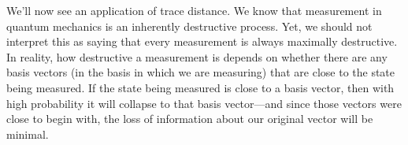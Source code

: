 \documentclass[11pt]{report}
\theoremstyle{plain}
\theoremstyle{definition}
\newtheorem{definition}[theorem]{Definition}
\newcommand{\Tr}{\operatorname{Tr}}
\begin{document}
We'll now see an application of trace distance. We know that measurement in quantum mechanics is an inherently destructive process. Yet, we should not interpret this as saying that every measurement is always maximally destructive. In reality, how destructive a measurement is depends on whether there are any basis vectors (in the basis in which we are measuring) that are close to the state being measured. If the state being measured is close to a basis vector, then with high probability it will collapse to that basis vector---and since those vectors were close to begin with, the loss of information about our original vector will be minimal.

\end{document}
